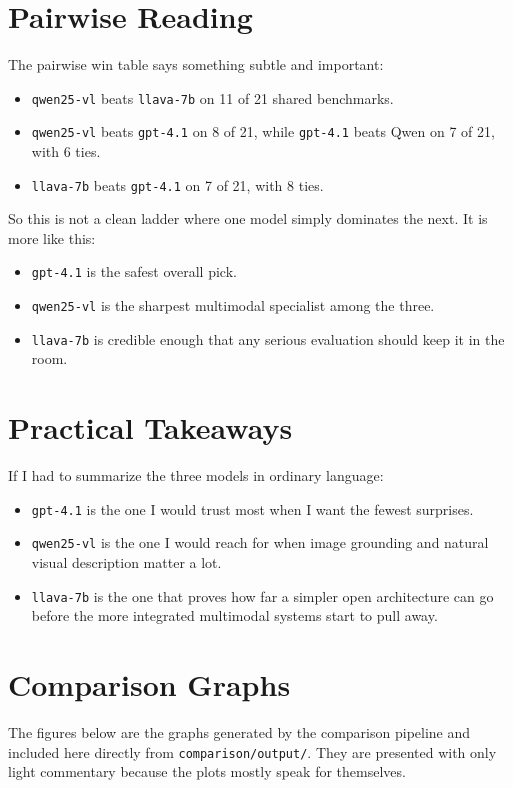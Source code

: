 \documentclass[11pt]{article}
\begin{document}
\section{Pairwise Reading}
The pairwise win table says something subtle and important:
\begin{itemize}[leftmargin=*]
    \item \texttt{qwen25-vl} beats \texttt{llava-7b} on 11 of 21 shared benchmarks.
    \item \texttt{qwen25-vl} beats \texttt{gpt-4.1} on 8 of 21, while \texttt{gpt-4.1} beats Qwen on 7 of 21, with 6 ties.
    \item \texttt{llava-7b} beats \texttt{gpt-4.1} on 7 of 21, with 8 ties.
\end{itemize}

\noindent
So this is not a clean ladder where one model simply dominates the next. It is more like this:
\begin{itemize}[leftmargin=*]
    \item \texttt{gpt-4.1} is the safest overall pick.
    \item \texttt{qwen25-vl} is the sharpest multimodal specialist among the three.
    \item \texttt{llava-7b} is credible enough that any serious evaluation should keep it in the room.
\end{itemize}

\section{Practical Takeaways}
If I had to summarize the three models in ordinary language:
\begin{itemize}[leftmargin=*]
    \item \texttt{gpt-4.1} is the one I would trust most when I want the fewest surprises.
    \item \texttt{qwen25-vl} is the one I would reach for when image grounding and natural visual description matter a lot.
    \item \texttt{llava-7b} is the one that proves how far a simpler open architecture can go before the more integrated multimodal systems start to pull away.
\end{itemize}

\section{Comparison Graphs}
The figures below are the graphs generated by the comparison pipeline and included here directly from \texttt{comparison/output/}. They are presented with only light commentary because the plots mostly speak for themselves.
\end{document}
